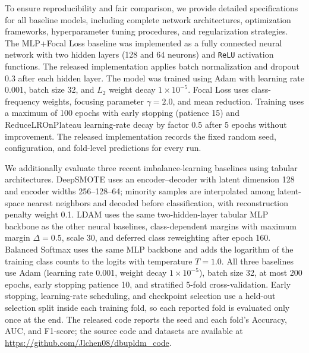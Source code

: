 \documentclass[a4paper]{cas-sc}
\begin{document}
{\color{magenta}To ensure reproducibility and fair comparison, we provide detailed specifications for all baseline models, including complete network architectures, optimization frameworks, hyperparameter tuning procedures, and regularization strategies. The MLP+Focal Loss baseline was implemented as a fully connected neural network with two hidden layers (128 and 64 neurons) and \texttt{ReLU} activation functions. The released implementation applies batch normalization and dropout 0.3 after each hidden layer. The model was trained using Adam with learning rate 0.001, batch size 32, and $L_2$ weight decay $1\times10^{-5}$. Focal Loss uses class-frequency weights, focusing parameter $\gamma=2.0$, and mean reduction. Training uses a maximum of 100 epochs with early stopping (patience 15) and ReduceLROnPlateau learning-rate decay by factor 0.5 after 5 epochs without improvement. The released implementation records the fixed random seed, configuration, and fold-level predictions for every run.}

{\color{red}We additionally evaluate three recent imbalance-learning baselines using tabular architectures. DeepSMOTE uses an encoder--decoder with latent dimension 128 and encoder widths 256--128--64; minority samples are interpolated among latent-space nearest neighbors and decoded before classification, with reconstruction penalty weight 0.1. LDAM uses the same two-hidden-layer tabular MLP backbone as the other neural baselines, class-dependent margins with maximum margin $\Delta=0.5$, scale 30, and deferred class reweighting after epoch 160. Balanced Softmax uses the same MLP backbone and adds the logarithm of the training class counts to the logits with temperature $T=1.0$. All three baselines use Adam (learning rate 0.001, weight decay $1\times10^{-5}$), batch size 32, at most 200 epochs, early stopping patience 10, and stratified 5-fold cross-validation. Early stopping, learning-rate scheduling, and checkpoint selection use a held-out selection split inside each training fold, so each reported fold is evaluated only once at the end. The released code reports the seed and each fold's Accuracy, AUC, and F1-score; the source code and datasets are available at \url{https://github.com/Jlchen08/dbupldm_code}.}
\end{document}

